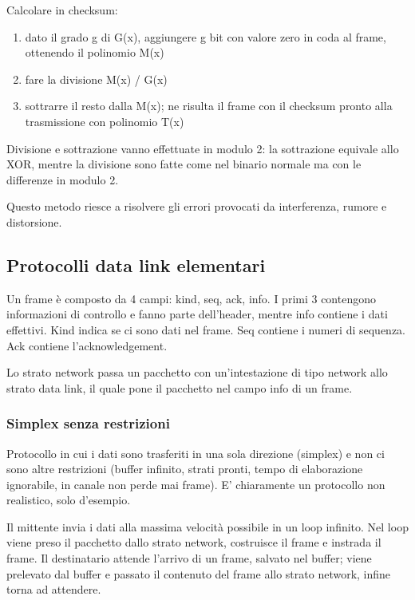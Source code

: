 Calcolare in checksum:
\begin{enumerate}
    \item dato il grado g di G(x), aggiungere g bit con valore zero in coda al frame, ottenendo il polinomio M(x)
    \item fare la divisione M(x) / G(x)
    \item sottrarre il resto dalla M(x); ne risulta il frame con il checksum pronto alla trasmissione con polinomio T(x)
\end{enumerate}
Divisione e sottrazione vanno effettuate in modulo 2: la sottrazione equivale allo XOR, mentre la divisione sono fatte come nel binario normale ma con le differenze in modulo 2.

Questo metodo riesce a risolvere gli errori provocati da interferenza, rumore e distorsione.

\subsection{Protocolli data link elementari} %
Un frame è composto da 4 campi: kind, seq, ack, info.
I primi 3 contengono informazioni di controllo e fanno parte dell'header, mentre info contiene i dati effettivi.
Kind indica se ci sono dati nel frame. Seq contiene i numeri di sequenza. Ack contiene l'acknowledgement.

Lo strato network passa un pacchetto con un'intestazione di tipo network allo strato data link, il quale pone il pacchetto nel campo info di un frame.

\subsubsection{Simplex senza restrizioni}
Protocollo in cui i dati sono trasferiti in una sola direzione (simplex) e non ci sono altre restrizioni
(buffer infinito, strati pronti, tempo di elaborazione ignorabile, in canale non perde mai frame).
E' chiaramente un protocollo non realistico, solo d'esempio.

Il mittente invia i dati alla massima velocità possibile in un loop infinito.
Nel loop viene preso il pacchetto dallo strato network, costruisce il frame e instrada il frame. 
Il destinatario attende l'arrivo di un frame, salvato nel buffer;
viene prelevato dal buffer e passato il contenuto del frame allo strato network, infine torna ad attendere.

